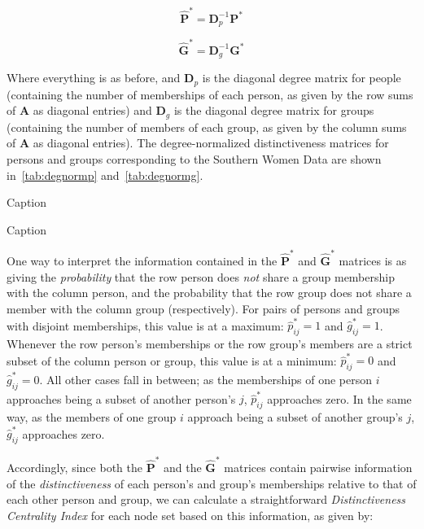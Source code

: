 \documentclass[a4paper,fleqn]{cas-sc}
\begin{document}
\begin{equation}
    \hat{\textbf{P}}^* = \textbf{D}_p^{-1}\textbf{P}^*
\end{equation}

\begin{equation}
    \hat{\textbf{G}}^* = \textbf{D}_g^{-1}\textbf{G}^*
\end{equation}

Where everything is as before, and $\textbf{D}_p$ is the diagonal degree matrix for people (containing the number of memberships of each person, as given by the row sums of $\mathbf{A}$ as diagonal entries) and $\textbf{D}_g$ is the diagonal degree matrix for groups (containing the number of members of each group, as given by the column sums of $\mathbf{A}$ as diagonal entries). The degree-normalized distinctiveness matrices for persons and groups corresponding to the Southern Women Data are shown in~\ref{tab:degnormp} and~\ref{tab:degnormg}.

\begin{table}[]
    \centering
    
    \caption{Caption}
    \label{tab:degnormp}
\end{table}

\begin{table}[]
    \centering
    
    \caption{Caption}
    \label{tab:degnormg}
\end{table}

One way to interpret the information contained in the $\hat{\textbf{P}}^*$ and $\hat{\textbf{G}}^*$ matrices is as giving the \textit{probability} that the row person does \textit{not} share a group membership with the column person, and the probability that the row group does not share a member with the column group (respectively). For pairs of persons and groups with disjoint memberships, this value is at a maximum: $\hat{p}_{ij}^* = 1$ and $\hat{g}_{ij}^* = 1$. Whenever the row person's memberships or the row group's members are a strict subset of the column person or group, this value is at a minimum: $\hat{p}_{ij}^* = 0$ and $\hat{g}_{ij}^* = 0$. All other cases fall in between; as the memberships of one person $i$ approaches being a subset of another person's $j$, $\hat{p}_{ij}^*$ approaches zero. In the same way, as the members of one group $i$ approach being a subset of another group's $j$, $\hat{g}_{ij}^*$ approaches zero. 

Accordingly, since both the $\hat{\textbf{P}}^*$ and the $\hat{\textbf{G}}^*$ matrices contain pairwise information of the \textit{distinctiveness} of each person's and group's memberships relative to that of each other person and group, we can calculate a straightforward \textit{Distinctiveness Centrality Index} for each node set based on this information, as given by:
\end{document}
